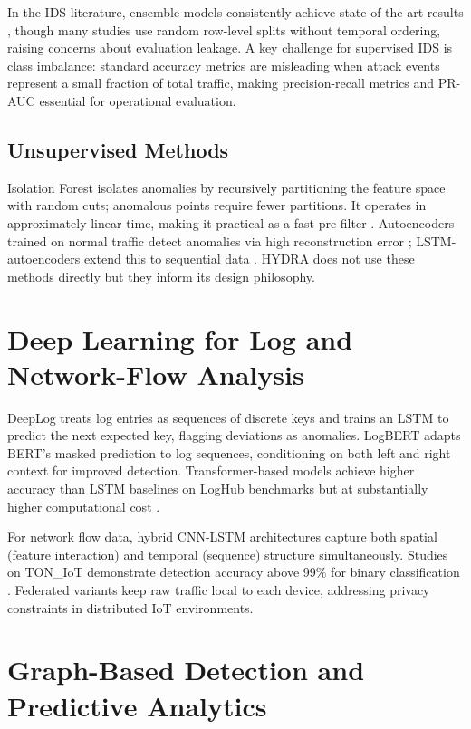 \documentclass[12pt,a4paper]{report}
\begin{document}
In the IDS literature, ensemble models consistently achieve state-of-the-art results \cite{shtayat2023,rani2024}, though many studies use random row-level splits without temporal ordering, raising concerns about evaluation leakage. A key challenge for supervised IDS is class imbalance: standard accuracy metrics are misleading when attack events represent a small fraction of total traffic, making precision-recall metrics and PR-AUC essential for operational evaluation.

\subsection{Unsupervised Methods}
\label{sec:unsupervised}

Isolation Forest \cite{liu2008} isolates anomalies by recursively partitioning the feature space with random cuts; anomalous points require fewer partitions. It operates in approximately linear time, making it practical as a fast pre-filter \cite{alsaedi2020}. Autoencoders trained on normal traffic detect anomalies via high reconstruction error \cite{moustafa2021}; LSTM-autoencoders extend this to sequential data \cite{malhotra2016,park2023}. HYDRA does not use these methods directly but they inform its design philosophy.

\section{Deep Learning for Log and Network-Flow Analysis}
\label{sec:deeplearning}

DeepLog \cite{du2017} treats log entries as sequences of discrete keys and trains an LSTM to predict the next expected key, flagging deviations as anomalies. LogBERT \cite{guo2021} adapts BERT's masked prediction to log sequences, conditioning on both left and right context for improved detection. Transformer-based models achieve higher accuracy than LSTM baselines on LogHub benchmarks but at substantially higher computational cost \cite{guo2021,le2023}.

For network flow data, hybrid CNN-LSTM architectures capture both spatial (feature interaction) and temporal (sequence) structure simultaneously. Studies on TON\_IoT demonstrate detection accuracy above 99\% for binary classification \cite{ferrag2022,imrana2021}. Federated variants \cite{popoola2021} keep raw traffic local to each device, addressing privacy constraints in distributed IoT environments.

\section{Graph-Based Detection and Predictive Analytics}
\label{sec:graphbased}
\end{document}
